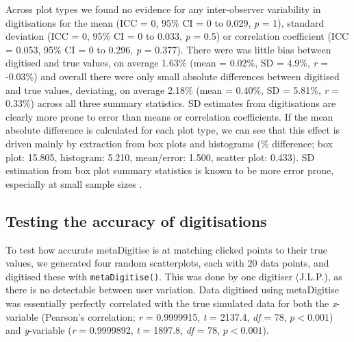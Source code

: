 \documentclass[12pt]{article}
\newcommand{\fct}[1]{\texttt{#1()}}
\newcommand{\pkg}[1]{{\fontseries{b}\selectfont #1}}
\begin{document}
Across plot types we found no evidence for any inter-observer variability in digitisations for the mean (ICC = 0, 95\% CI = 0 to 0.029, \textit{p} = 1), standard deviation (ICC = 0, 95\% CI = 0 to 0.033, \textit{p} = 0.5) or correlation coefficient (ICC = 0.053, 95\% CI = 0 to 0.296, \textit{p} = 0.377). There were was little bias between digitised and true values, on average 1.63\% (mean = 0.02\%, SD = 4.9\%, \textit{r} = -0.03\%) and overall there were only small absolute differences between digitised and true values, deviating, on average 2.18\% (mean = 0.40\%, SD = 5.81\%, \textit{r} = 0.33\%) across all three summary statistics. SD estimates from digitisations are clearly more prone to error than means or correlation coefficients. If the mean absolute difference is calculated for each plot type, we can see that this effect is driven mainly by extraction from box plots and histograms (\% difference; box plot: 15.805, histogram: 5.210, mean/error: 1.500, scatter plot: 0.433). SD estimation from box plot summary statistics is known to be more error prone, especially at small sample sizes \citep{Wan2014}.

\subsection{Testing the accuracy of digitisations}
To test how accurate \pkg{metaDigitise} is at matching clicked points to their true values, we generated four random scatterplots, each with 20 data points, and digitised these with \fct{metaDigitise}. This was done by one digitiser (J.L.P.), as there is no detectable between user variation. Data digitised using \pkg{metaDigitise} was essentially perfectly correlated with the true simulated data for both the \textit{x}-variable (Pearson's correlation; \textit{r} = 0.9999915, \textit{t} = 2137.4, \textit{df} = 78, $p < 0.001$) and \textit{y}-variable (\textit{r} = 0.9999892, \textit{t} = 1897.8, \textit{df} = 78, $p < 0.001$).
\end{document}
